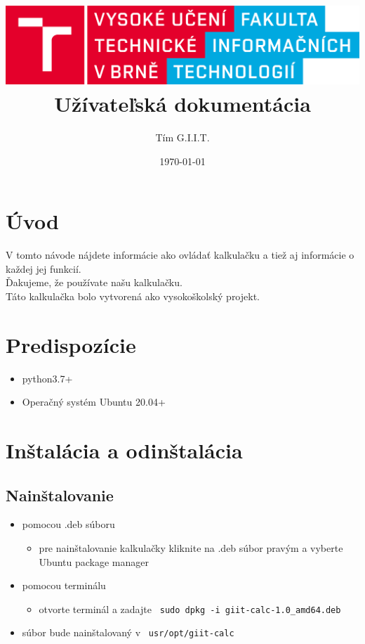 \documentclass[a4paper, 11pt]{article}
\title{\includegraphics[scale=0.1,keepaspectratio]{./src/latex/pics/logo_cz.eps}\\Užívateľská dokumentácia}
\author{Tím G.I.I.T.}
\date{\today}
\begin{document}
	\maketitle
	\tableofcontents
	\newpage
	
    \section{Úvod}
    V tomto návode nájdete informácie ako ovládať kalkulačku a tiež aj informácie o každej jej funkcií.\\
    Ďakujeme, že používate našu kalkulačku. \\
    Táto kalkulačka bolo vytvorená ako vysokoškolský projekt. 
    \section{Predispozície}
    \begin{itemize}
        \item python3.7+
        \item Operačný systém Ubuntu 20.04+
    \end{itemize}
    \section{Inštalácia a odinštalácia}
    \subsection{Nainštalovanie}
    \begin{itemize}
        \item pomocou .deb súboru
        \begin{itemize}
            \item pre nainštalovanie kalkulačky kliknite na .deb súbor pravým a vyberte Ubuntu package manager
        \end{itemize}
        \item pomocou terminálu
        \begin{itemize}
            \item otvorte terminál a zadajte \texttt{ sudo dpkg -i giit-calc-1.0\_amd64.deb }
        \end{itemize}
        \item súbor bude nainštalovaný v \texttt{ usr/opt/giit-calc }
    \end{itemize}
\end{document}
